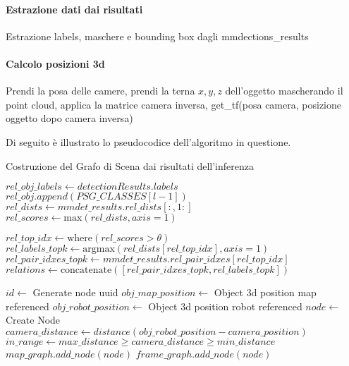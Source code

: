 \paragraph{Estrazione dati dai risultati}
Estrazione labels, maschere e bounding box dagli mmdections\_results
\paragraph{Calcolo posizioni 3d}
Prendi la posa delle camere, prendi la terna $x,y,z$ dell'oggetto mascherando il point cloud, applica la matrice camera inversa, get\_tf(posa camera, posizione oggetto dopo camera inversa)


Di seguito è illustrato lo pseudocodice dell'algoritmo in questione.
\begin{algorithm}[H]
  \caption{Costruzione del Grafo di Scena dai risultati dell'inferenza}
  \begin{algorithmic}[1]
  \State $rel\_obj\_labels \gets detectionResults.labels$
    \State $rel\_obj.append(PSG\_CLASSES[l - 1])$
  \EndFor
  \State $rel\_dists \gets mmdet\_results.rel\_dists[:, 1:]$
  \State $rel\_scores \gets \text{max}(rel\_dists, axis=1)$
  
  \State $rel\_top\_idx \gets \text{where}(rel\_scores > \theta)$
  \State $rel\_labels\_topk \gets \text{argmax}(rel\_dists[rel\_top\_idx], axis=1)$
  \State $rel\_pair\_idxes\_topk \gets mmdet\_results.rel\_pair\_idxes[rel\_top\_idx]$
  \State $relations \gets \text{concatenate}([rel\_pair\_idxes\_topk, rel\_labels\_topk])$
  
      \State $id \gets$ Generate node uuid 
      \State $obj\_map\_position \gets$ Object 3d position map referenced
      \State $obj\_robot\_position \gets$ Object 3d position robot referenced
      \State $node \gets$ Create Node
      \State $camera\_distance \gets distance(obj\_robot\_position - camera\_position)$
      \State $in\_range \gets max\_distance \geq camera\_distance \geq min\_distance$
          \State $map\_graph.add\_node(node)$
            \State $frame\_graph.add\_node(node)$
          \EndIf
      \EndIf
  \EndFor
  

\end{algorithmic}
\end{algorithm}
